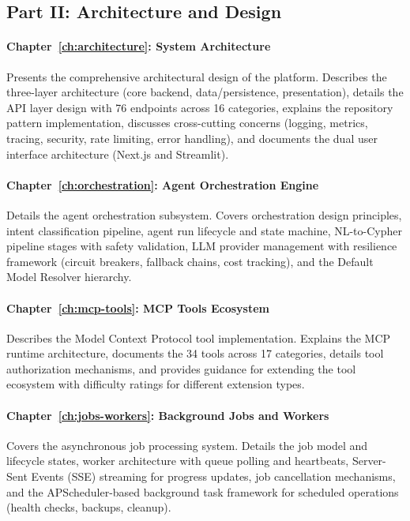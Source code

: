 \subsection{Part II: Architecture and Design}

\paragraph{Chapter~\ref{ch:architecture}: System Architecture}
Presents the comprehensive architectural design of the platform. Describes the three-layer architecture (core backend, data/persistence, presentation), details the API layer design with 76 endpoints across 16 categories, explains the repository pattern implementation, discusses cross-cutting concerns (logging, metrics, tracing, security, rate limiting, error handling), and documents the dual user interface architecture (Next.js and Streamlit).

\paragraph{Chapter~\ref{ch:orchestration}: Agent Orchestration Engine}
Details the agent orchestration subsystem. Covers orchestration design principles, intent classification pipeline, agent run lifecycle and state machine, NL-to-Cypher pipeline stages with safety validation, LLM provider management with resilience framework (circuit breakers, fallback chains, cost tracking), and the Default Model Resolver hierarchy.

\paragraph{Chapter~\ref{ch:mcp-tools}: MCP Tools Ecosystem}
Describes the Model Context Protocol tool implementation. Explains the MCP runtime architecture, documents the 34 tools across 17 categories, details tool authorization mechanisms, and provides guidance for extending the tool ecosystem with difficulty ratings for different extension types.

\paragraph{Chapter~\ref{ch:jobs-workers}: Background Jobs and Workers}
Covers the asynchronous job processing system. Details the job model and lifecycle states, worker architecture with queue polling and heartbeats, Server-Sent Events (SSE) streaming for progress updates, job cancellation mechanisms, and the APScheduler-based background task framework for scheduled operations (health checks, backups, cleanup).

